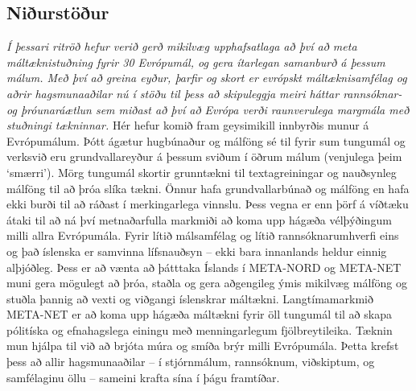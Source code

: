 \documentclass{../../metanetpaper}
\begin{document}
\begin{multicols}{2}
\subsection{Niðurstöður}
\emph{Í þessari ritröð hefur verið gerð mikilvæg upphafsatlaga að því að meta máltæknistuðning fyrir 30 Evrópumál, og gera ítarlegan samanburð á þessum málum. Með því að greina eyður, þarfir og skort er evrópskt máltæknisamfélag og aðrir hagsmunaaðilar nú í stöðu til þess að skipuleggja meiri háttar rannsóknar- og þróunaráætlun sem miðast að því að Evrópa verði raunverulega margmála með stuðningi tækninnar.}
Hér hefur komið fram geysimikill innbyrðis munur á Evrópumálum. Þótt ágætur hugbúnaður og málföng sé til fyrir sum tungumál og verksvið eru grundvallareyður á þessum sviðum í öðrum málum (venjulega þeim ‘smærri’). Mörg tungumál skortir grunntækni til textagreiningar og nauðsynleg málföng til að þróa slíka tækni. Önnur hafa grundvallarbúnað og málföng en hafa ekki burði til að ráðast í merkingarlega vinnslu. Þess vegna er enn þörf á víðtæku átaki til að ná því metnaðarfulla markmiði að koma upp hágæða vélþýðingum milli allra Evrópumála.
Fyrir lítið málsamfélag og lítið rannsóknarumhverfi eins og það íslenska er samvinna lífsnauðsyn -- ekki bara innanlands heldur einnig alþjóðleg. Þess er að vænta að þátttaka Íslands í META-NORD og META-NET muni gera mögulegt að þróa, staðla og gera aðgengileg ýmis mikilvæg málföng og stuðla þannig að vexti og viðgangi íslenskrar máltækni. 
Langtímamarkmið META-NET er að koma upp hágæða máltækni fyrir öll tungumál til að skapa pólitíska og efnahagslega einingu með menningarlegum fjölbreytileika. Tæknin mun hjálpa til við að brjóta múra og smíða brýr milli Evrópumála. Þetta krefst þess að allir hagsmunaaðilar -- í stjórnmálum, rannsóknum, viðskiptum, og samfélaginu öllu -- sameini krafta sína í þágu framtíðar.\linebreak
\end{multicols}
\end{document}
